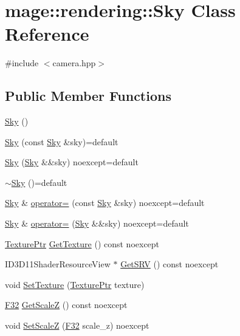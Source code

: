 \hypertarget{classmage_1_1rendering_1_1_sky}{}\section{mage\+:\+:rendering\+:\+:Sky Class Reference}
\label{classmage_1_1rendering_1_1_sky}


{\ttfamily \#include $<$camera.\+hpp$>$}

\subsection*{Public Member Functions}
\begin{DoxyCompactItemize}
\item 
\mbox{\hyperlink{classmage_1_1rendering_1_1_sky_a9679ec331c5e0fc01c49760f6e74664d}{Sky}} ()
\item 
\mbox{\hyperlink{classmage_1_1rendering_1_1_sky_aeafa720fff92be3f02d484a47443b973}{Sky}} (const \mbox{\hyperlink{classmage_1_1rendering_1_1_sky}{Sky}} \&sky)=default
\item 
\mbox{\hyperlink{classmage_1_1rendering_1_1_sky_aa1484300b69e97812d73e0f5281d8bbc}{Sky}} (\mbox{\hyperlink{classmage_1_1rendering_1_1_sky}{Sky}} \&\&sky) noexcept=default
\item 
\mbox{\hyperlink{classmage_1_1rendering_1_1_sky_a948ac13394c361864f1da3dc27ab3326}{$\sim$\+Sky}} ()=default
\item 
\mbox{\hyperlink{classmage_1_1rendering_1_1_sky}{Sky}} \& \mbox{\hyperlink{classmage_1_1rendering_1_1_sky_a9654c598bd30fee1b0892b0abf7b7c96}{operator=}} (const \mbox{\hyperlink{classmage_1_1rendering_1_1_sky}{Sky}} \&sky) noexcept=default
\item 
\mbox{\hyperlink{classmage_1_1rendering_1_1_sky}{Sky}} \& \mbox{\hyperlink{classmage_1_1rendering_1_1_sky_a01b1145f77fdab81e7dce93f6a524b45}{operator=}} (\mbox{\hyperlink{classmage_1_1rendering_1_1_sky}{Sky}} \&\&sky) noexcept=default
\item 
\mbox{\hyperlink{namespacemage_1_1rendering_a6f3ae54f825328465b0cdde0f0de4a36}{Texture\+Ptr}} \mbox{\hyperlink{classmage_1_1rendering_1_1_sky_a575698f7fafad47d544f88bf4e2eea5e}{Get\+Texture}} () const noexcept
\item 
I\+D3\+D11\+Shader\+Resource\+View $\ast$ \mbox{\hyperlink{classmage_1_1rendering_1_1_sky_a8ded7262b242de3e76e4bdcd5a91f4c3}{Get\+S\+RV}} () const noexcept
\item 
void \mbox{\hyperlink{classmage_1_1rendering_1_1_sky_aca571c68ad345801051fcc36e32013e6}{Set\+Texture}} (\mbox{\hyperlink{namespacemage_1_1rendering_a6f3ae54f825328465b0cdde0f0de4a36}{Texture\+Ptr}} texture)
\item 
\mbox{\hyperlink{namespacemage_aa97e833b45f06d60a0a9c4fc22ae02c0}{F32}} \mbox{\hyperlink{classmage_1_1rendering_1_1_sky_a12023dbc7f9511152719cee35a84fc34}{Get\+ScaleZ}} () const noexcept
\item 
void \mbox{\hyperlink{classmage_1_1rendering_1_1_sky_a92fcaf3c89a39fd97a37ab61adf1c194}{Set\+ScaleZ}} (\mbox{\hyperlink{namespacemage_aa97e833b45f06d60a0a9c4fc22ae02c0}{F32}} scale\+\_\+z) noexcept
\end{DoxyCompactItemize}
